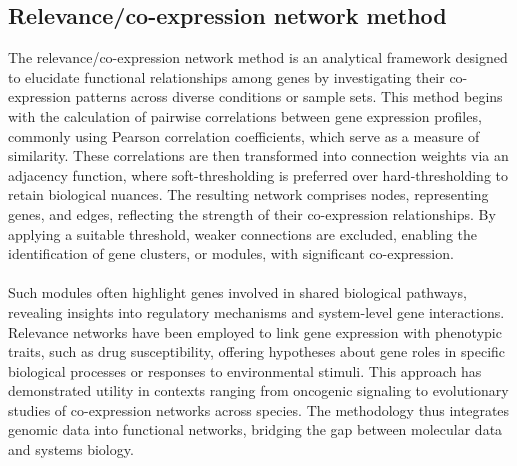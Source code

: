 \subsection{Relevance/co-expression network method}\label{subsec:relevance-co-expression-network-method}

The relevance/co-expression network method is an analytical framework designed to elucidate functional relationships among genes by investigating their co-expression patterns across diverse conditions or sample sets.
This method begins with the calculation of pairwise correlations between gene expression profiles, commonly using Pearson correlation coefficients, which serve as a measure of similarity\supercite{zhang_general_2005}.
These correlations are then transformed into connection weights via an adjacency function, where soft-thresholding is preferred over hard-thresholding to retain biological nuances\supercite{butte_discovering_2000, oldham_conservation_2006}.
The resulting network comprises nodes, representing genes, and edges, reflecting the strength of their co-expression relationships.
By applying a suitable threshold, weaker connections are excluded, enabling the identification of gene clusters, or modules, with significant co-expression\supercite{schmitt_elucidation_2004}.
\\\\
Such modules often highlight genes involved in shared biological pathways, revealing insights into regulatory mechanisms and system-level gene interactions\supercite{horvath_analysis_2006}.
Relevance networks have been employed to link gene expression with phenotypic traits, such as drug susceptibility, offering hypotheses about gene roles in specific biological processes or responses to environmental stimuli\supercite{butte_discovering_2000}.
This approach has demonstrated utility in contexts ranging from oncogenic signaling to evolutionary studies of co-expression networks across species\supercite{oldham_conservation_2006}.
The methodology thus integrates genomic data into functional networks, bridging the gap between molecular data and systems biology.
\\\\

